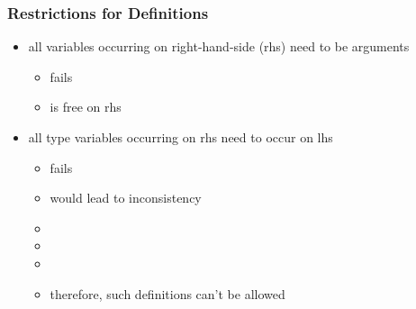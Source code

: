 \begin{frame}[fragile]
\frametitle{Restrictions for Definitions}
\begin{itemize}
\item all variables occurring on right-hand-side (rhs) need to be arguments
\begin{itemize}
\item \eg {} fails
\item {} is free on rhs
\end{itemize}
\item all type variables occurring on rhs need to occur on lhs
\begin{itemize}
\item \eg {} fails
\item {} would lead to inconsistency
\item {}
\item {}
\item {}
\item therefore, such definitions can't be allowed
\end{itemize}

\end{itemize}
\end{frame}



